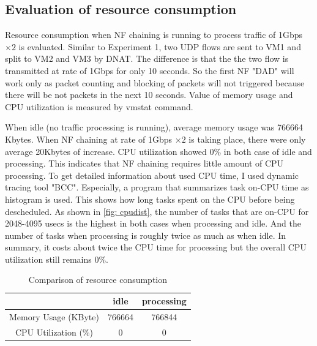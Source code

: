 \subsection{Evaluation of resource consumption}
Resource consumption when NF chaining is running to process traffic of 1Gbps $\times 2 $ is evaluated. Similar to Experiment 1, two UDP flows are sent to VM1 and split to VM2 and VM3 by DNAT. The difference is that the the two flow is transmitted at rate of 1Gbps for only 10 seconds. So the first NF "DAD" will work only as packet counting and blocking of packets will not triggered because there will be not packets in the next 10 seconds. Value of memory usage and CPU utilization is measured by vmstat command. 

When idle (no traffic processing is running), average memory usage was 766664 Kbytes. When NF chaining at rate of 1Gbps $\times 2 $ is taking place, there were only average 20Kbytes of increase. CPU utilization showed 0\% in both case of idle and processing. This indicates that NF chaining requires little amount of CPU processing. To get detailed information about used CPU time, I used dynamic tracing tool "BCC". Especially, a program that summarizes task on-CPU time as histogram is used. This shows how long tasks spent on the CPU before being descheduled. As shown in \ref{fig: cpudist}, the number of tasks that are on-CPU for 2048-4095 usecs is the highest in both cases when processing and idle. And the number of tasks when processing is roughly twice as much as when idle. In summary, it costs about twice the CPU time for processing but the overall CPU utilization still remains 0\%. 

\begin{table}
	\centering
	\begin{tabular}{|c|c|c|}
	\hline
	 & idle & processing \\
	 \hline
	 Memory Usage (KByte) & 766664 & 766844 \\
	 \hline
	 CPU Utilization (\%) & 0 & 0 \\
	 \hline
	\end{tabular}
	\caption{Comparison of resource consumption}
	\label{tbl: resource}
\end{table}

